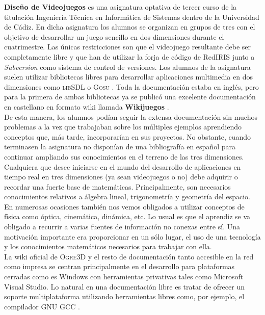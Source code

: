 \textbf{Diseño de Videojuegos} es una asignatura optativa de tercer curso
de la titulación Ingeniería Técnica en Informática de Sistemas dentro
de la Universidad de Cádiz. En dicha asignatura los alumnos se organizan
en grupos de tres con el objetivo de desarrollar un juego sencillo en dos
dimensiones durante el cuatrimestre. Las únicas restricciones son que
el videojuego resultante debe ser completamente libre y que han de utilizar
la forja de código de RedIRIS \cite{website:rediris} junto a \textit{Subversion} 
\cite{website:svn} como sistema de control de versiones. Los alumnos de la
asignatura suelen utilizar bibliotecas libres para desarrollar aplicaciones
multimedia en dos dimensiones como \textsc{libSDL} \cite{website:sdl} o
\textsc{Gosu} \cite{website:gosu}. Toda la documentación estaba en inglés, pero
para la primera de ambas bibliotecas ya se publicó una excelente documentación
en castellano en formato wiki llamada \textbf{Wikijuegos} \cite{website:wikijuegos}.\\

De esta manera, los alumnos podían seguir la extensa documentación sin
muchos problemas a la vez que trabajaban sobre los múltiples ejemplos
aprendiendo conceptos que, más tarde, incorporarían en sus proyectos. No 
obstante, cuando terminasen la asignatura no disponían de una bibliografía
en español para continuar ampliando sus conocimientos en el terreno de las
tres dimensiones.\\

Cualquiera que desee iniciarse en el mundo del desarrollo de aplicaciones
en tiempo real en tres dimensiones (ya sean videojuegos o no) debe adquirir
o recordar una fuerte base de matemáticas. Principalmente, son necesarios
conocimientos relativos a álgebra lineal, trigonometría y geometría del espacio.
En numerosas ocasiones también nos vemos obligados a utilizar
conceptos de física como óptica, cinemática, dinámica, etc. Lo usual es que
el aprendiz se va obligado a recurrir a varias fuentes de información
no conexas entre sí. Una motivación importante era proporcionar en un sólo
lugar, el uso de una tecnología y los conocimientos matemáticos necesarios
para trabajar con ella.\\

La wiki oficial de \textsc{Ogre3D} \cite{website:ogre3d-wiki} y el resto
de documentación tanto accesible en la red como impresa se centran principalmente
en el desarrollo para plataformas cerradas como es Windows con herramientas
privativas tales como Microsoft Visual Studio. Lo natural en una documentación
libre es tratar de ofrecer un soporte multiplataforma utilizando herramientas
libres como, por ejemplo, el compilador GNU GCC \cite{website:gnu-gcc}.\\

